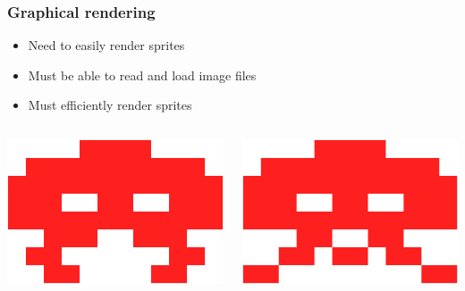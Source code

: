 \documentclass{beamer}
\newcommand{\<}[1]{\`#1}
\begin{document}
\begin{frame}
  \frametitle{Graphical rendering}
  
  \begin{itemize}
  \item Need to easily render sprites
  \item Must be able to read and load image files
  \item Must efficiently render sprites
  \end{itemize}

  \begin{block}{}
    \begin{columns}[c]
      \begin{column}[c]{2cm}
        \includegraphics[scale=0.2]{easy0}
      \end{column}
      \begin{column}[c]{2cm}
        \includegraphics[scale=0.2]{easy1}
      \end{column}
    \end{columns}
  \end{block}

\end{frame}
\end{document}

